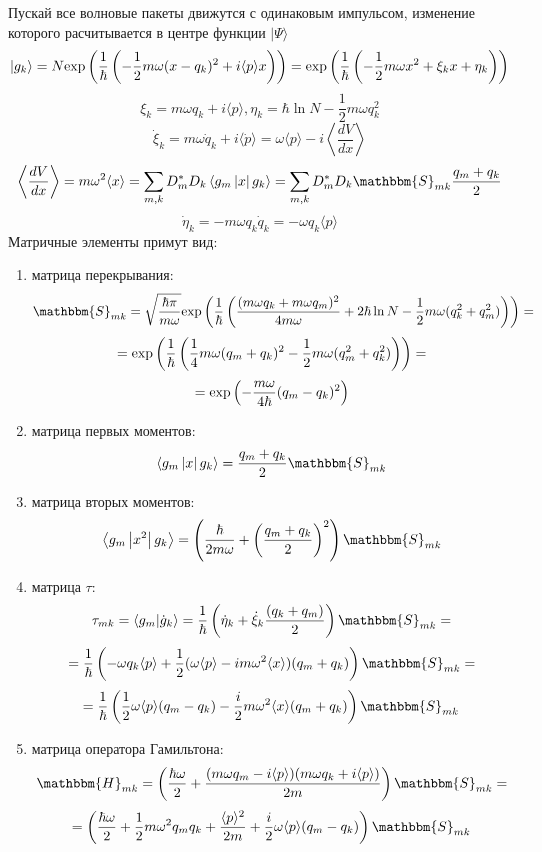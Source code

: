 Пускай все волновые пакеты движутся с одинаковым импульсом, изменение которого расчитывается в центре функции $|\Psi\rangle$
$$|g_k\rangle = N\myexp{\frac{1}{\hbar}\left(-\frac{1}{2}m\omega(x-q_k)^2+i\langle p\rangle x\right)} = %
		 \myexp{\frac{1}{\hbar}\left(-\frac{1}{2}m\omega x^2 + \xi_k x + \eta_k\right)}$$
$$\xi_k = m\omega q_k + i\langle p\rangle, \eta_k = \hbar\ln N - \frac{1}{2}m\omega q_k^2$$
$$\dot{\xi}_k = m\omega \dot{q}_k+i\langle\dot{p} \rangle = %
	         \omega\langle p\rangle - i\left\langle\frac{dV}{dx}\right\rangle$$
$$\left\langle\frac{dV}{dx}\right\rangle = %
  m\omega^2\langle x\rangle %
= \sum_{m,k}D_m^*D_k\mymean{g_m}{x}{g_k}=%
  \sum_{m,k}D_m^*D_k\mathbbm{S}_{mk}\frac{q_m+q_k}{2}$$
$$\dot{\eta}_k = -m\omega q_k\dot{q}_k = -\omega q_k\langle p\rangle$$
Матричные элементы примут вид:
\begin{enumerate}
\item матрица перекрывания:
$$\mathbbm{S}_{mk}=\sqrt{\frac{\hbar\pi}{m\omega}}\myexp{\frac{1}{\hbar}\left(\frac{(m\omega q_k+m\omega q_m)^2}{4m\omega}+%
									      2\hbar\ln N-\frac{1}{2}m\omega(q_k^2+q_m^2)\right)}=$$
$$=\text{exp}\left( \frac{1}{\hbar}\left(\frac{1}{4}m\omega(q_m+q_k)^2-\frac{1}{2}m\omega(q_m^2+q_k^2)\right) \right)=$$
$$=\text{exp}\left( -\frac{m\omega}{4\hbar}(q_m-q_k)^2 \right)$$
\item матрица первых моментов:
$$\mymean{g_m}{x}{g_k}=\frac{q_m+q_k}{2}\mathbbm{S}_{mk}$$
\item матрица вторых моментов:
$$\mymean{g_m}{x^2}{g_k}=\left(\frac{\hbar}{2m\omega}+\left(\frac{q_m+q_k}{2}\right)^2\right)\mathbbm{S}_{mk}$$
\item матрица $\tau$:
$$\tau_{mk} = \myint{g_m}{\dot{g}_k}=\frac{1}{\hbar}\left(\dot{\eta}_k+\dot{\xi}_k\frac{(q_k+q_m)}{2}\right)\mathbbm{S}_{mk}=$$
$$=\frac{1}{\hbar}\left(-\omega q_k\langle p\rangle+\frac{1}{2}(\omega\langle p\rangle-im\omega^2\langle x\rangle)(q_m+q_k)\right)\mathbbm{S}_{mk}=$$
$$=\frac{1}{\hbar}\left(\frac{1}{2}\omega\langle p\rangle(q_m-q_k) - \frac{i}{2}m\omega^2\langle x\rangle(q_m+q_k)\right)\mathbbm{S}_{mk}$$
\item матрица оператора Гамильтона:
$$\mathbbm{H}_{mk} = \left(\frac{\hbar\omega}{2}+\frac{(m\omega q_m-i\langle p\rangle)(m\omega q_k+i\langle p\rangle)}{2m}\right)\mathbbm{S}_{mk}=$$
$$=\left(\frac{\hbar\omega}{2}+\frac{1}{2}m\omega^2 q_mq_k+\frac{\langle p\rangle^2}{2m}+\frac{i}{2}\omega\langle p\rangle(q_m-q_k)\right)\mathbbm{S}_{mk}$$
\end{enumerate}

